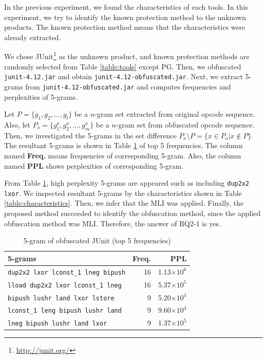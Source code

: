 \documentclass[conference]{IEEEtran}
\begin{document}
In the previous experiment, we found the characteristics of each
tools.  In this experiment, we try to identify the known protection
method to the unknown products.
The known protection method means that the characteristics were
already extracted. 

We chose JUnit\footnote[5]{\url{http://junit.org/}} as the unknown
product, and known protection methods are randomly selected from Table
\ref{table:tools} except PG.  Then, we obfuscated \texttt{
  junit-4.12.jar} and obtain \texttt{junit-4.12-obfuscated.jar}.
Next, we extract 5-grams from \texttt{junit-4.12-obfuscated.jar} and
computes frequencies and perplexities of 5-grams.

Let $P=\{ g_1, g_2, ..., g_l \}$ be a $n$-gram set extracted from
original opcode sequence.  Also, let $P_o=\{ g^o_1, g^o_2, ..., g^o_m
\}$ be a $n$-gram set from obfuscated opcode sequence.  Then, we
investigated the 5-grams in the set difference $P_o \setminus P = \{ x
\in P_o | x \not\in P \}$.  The resultant 5-grams is shown in Table
\ref{table:junit} of top 5 frequencies.  The column named
\textbf{Freq.} means frequencies of corresponding 5-gram.  Also, the
column named \textbf{PPL} shows perplexities of corresponding 5-gram.

From Table \ref{table:junit}, high perplexity 5-grams are appeared
such as including \texttt{dup2x2 lxor}.  We inspected resultant
5-grams by the characteristics shown in Table
\ref{table:characteristics}.  Then, we infer that the MLI was applied.
Finally, the proposed method succeeded to identify the obfuscation
method, since the applied obfuscation method was MLI.
Therefore, the answer of RQ2-1 is yes.


\begin{table}[t]
  \centering
  \footnotesize{
    \caption{5-gram of obfuscated JUnit (top 5 frequencies)}\label{table:junit}
  \begin{tabular}{l|r|r}
    \textbf{5-grams} & \textbf{Freq.} & \textbf{PPL}\\ \hline
    \texttt{dup2x2 lxor lconst\_1 lneg bipush}   & 16 & 1.13$\times10^6$ \\
    \texttt{lload dup2x2 lxor lconst\_1 lneg}    & 16 & 5.37$\times10^5$ \\
    \texttt{bipush lushr land lxor lstore}       &  9 & 5.20$\times10^4$ \\
    \texttt{lconst\_1 leng bipush lushr land}    &  9 & 9.60$\times10^4$ \\
    \texttt{lneg bipush lushr land lxor}         &  9 & 1.37$\times10^5$ \\
  \end{tabular}}
\end{table}
\end{document}

